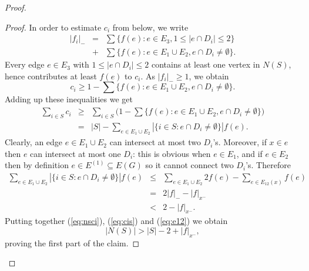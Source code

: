 \documentclass{article}
\theoremstyle{definition}
\begin{document}
\begin{proof}
\begin{proof}
In order to estimate $c_i$ from below, we write
\begin{eqnarray} \label{eq:twosums}
|f_i|_- & = & \sum \{ f(e): e \in E_3, 1 \le |e \cap D_i| \le 2\} \nonumber \\  & + & \sum \{ f(e): e \in E_1 \cup E_2, e \cap D_i \ne \emptyset\}.
\end{eqnarray}
Every edge $e \in E_3$ with $1 \le |e \cap D_i| \le 2$ contains at least one vertex in $N(S)$, hence contributes at least $f(e)$ to $c_i$. As $|f_i|_- \ge 1$, we obtain \[ c_i \ge 1 - \sum \{ f(e): e \in E_1 \cup E_2, e \cap D_i \ne \emptyset \}.\] Adding up these inequalities we get
\begin{eqnarray} \label{eq:cis}
\sum_{i \in S} c_i & \ge & \sum_{i \in S} \bigl( 1 - \sum \{ f(e): e \in E_1 \cup E_2, e \cap D_i \ne \emptyset \} \bigr) \nonumber \\
& = & |S| - \sum_{e \in E_1 \cup E_2} |\{ i \in S: e \cap D_i \ne \emptyset \}| f(e).
\end{eqnarray}
Clearly, an edge $e \in E_1 \cup E_2$ can intersect at most two $D_i$'s. Moreover, if $x \in e$ then $e$ can intersect at most one $D_i$: this is obvious when $e \in E_1$, and if $e \in E_2$ then by definition $e \in E^{(1)} \subseteq E(G)$ so it cannot connect two $D_i$'s. Therefore
\begin{eqnarray} \label{eq:e12}
\sum_{e \in E_1 \cup E_2} |\{ i \in S: e \cap D_i \ne \emptyset \}| f(e) & \le & \sum_{e \in E_1 \cup E_2} 2f(e) - \sum_{e \in E_{12}(x)} f(e) \nonumber \\
& = & 2|f|_- - |f|_{x^-} \nonumber \\
& < & 2 - |f|_{x^-}.
\end{eqnarray}
Putting together (\ref{eq:nsci}), (\ref{eq:cis}) and (\ref{eq:e12}) we obtain \[ |N(S)| > |S| - 2 + |f|_{x^-},\] proving the first part of the claim.


\end{proof}
\end{proof}
\end{document}
